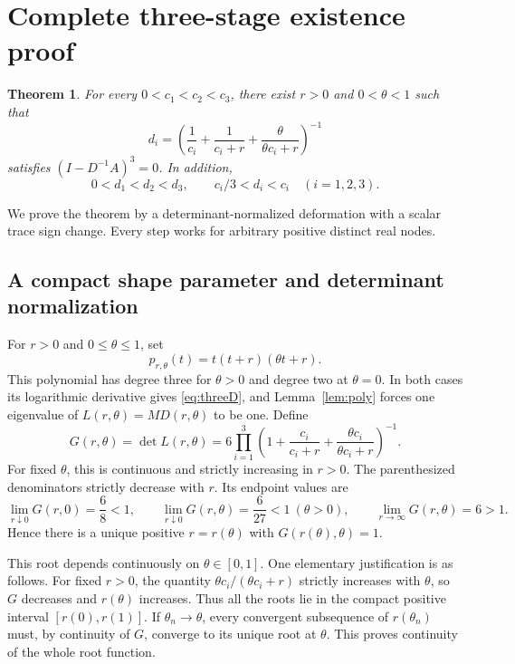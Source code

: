 \documentclass[11pt]{article}
\newtheorem{theorem}{Theorem}[section]
\theoremstyle{remark}
\begin{document}
\section{Complete three-stage existence proof}
\begin{theorem}\label{thm:three}
For every $0<c_1<c_2<c_3$, there exist $r>0$ and $0<\theta<1$ such that
\begin{equation}\label{eq:threeD}
 d_i=\left(\frac1{c_i}+\frac1{c_i+r}
                  +\frac{\theta}{\theta c_i+r}\right)^{-1}
\end{equation}
satisfies $(I-D^{-1}A)^3=0$. In addition,
\[
 0<d_1<d_2<d_3,\qquad c_i/3<d_i<c_i\quad(i=1,2,3).
\]
\end{theorem}
We prove the theorem by a determinant-normalized deformation with a scalar
trace sign change. Every step works for arbitrary positive distinct real nodes.

\subsection{A compact shape parameter and determinant normalization}
For $r>0$ and $0\leq\theta\leq1$, set
\begin{equation}\label{eq:p3}
 p_{r,\theta}(t)=t(t+r)(\theta t+r).
\end{equation}
This polynomial has degree three for $\theta>0$ and degree two at $\theta=0$.
In both cases its logarithmic derivative gives \eqref{eq:threeD}, and
Lemma~\ref{lem:poly} forces one eigenvalue of $L(r,\theta)=M D(r,\theta)$ to
be one. Define
\begin{equation}\label{eq:G}
 G(r,\theta)=\det L(r,\theta)
 =6\prod_{i=1}^3\left(1+\frac{c_i}{c_i+r}
                 +\frac{\theta c_i}{\theta c_i+r}\right)^{-1}.
\end{equation}
For fixed $\theta$, this is continuous and strictly increasing in $r>0$.
The parenthesized denominators strictly decrease with $r$. Its endpoint
values are
\[
 \lim_{r\downarrow0}G(r,0)=\frac68<1,\qquad
 \lim_{r\downarrow0}G(r,\theta)=\frac6{27}<1\ (\theta>0),\qquad
 \lim_{r\to\infty}G(r,\theta)=6>1.
\]
Hence there is a unique positive $r=r(\theta)$ with $G(r(\theta),\theta)=1$.

This root depends continuously on $\theta\in[0,1]$. One elementary justification
is as follows. For fixed $r>0$, the quantity
$\theta c_i/(\theta c_i+r)$ strictly increases with $\theta$, so $G$ decreases
and $r(\theta)$ increases. Thus all the roots lie in the compact positive
interval $[r(0),r(1)]$. If $\theta_n\to\theta$, every convergent subsequence of
$r(\theta_n)$ must, by continuity of $G$, converge to its unique root at
$\theta$. This proves continuity of the whole root function.
\end{document}

